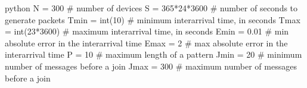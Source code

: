 \begin{mintedbox}{python}
N = 300     # number of devices
S = 365*24*3600     # number of seconds to generate packets
Tmin = int(10)      # minimum interarrival time, in seconds
Tmax = int(23*3600)     # maximum interarrival time, in seconds
Emin = 0.01     # min absolute error in the interarrival time
Emax = 2        # max absolute error in the interarrival time
P = 10      # maximum length of a pattern
Jmin = 20       # minimum number of messages before a join
Jmax = 300      # maximum number of messages before a join
\end{mintedbox}